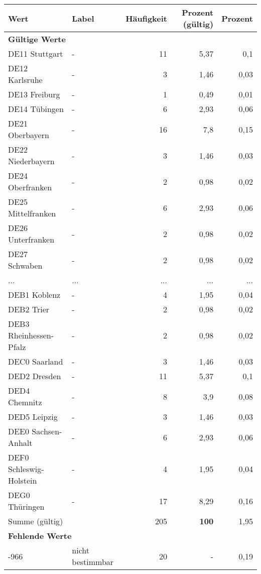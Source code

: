     \begin{longtable}{Xlrrr}
     \toprule
     \textbf{Wert} & \textbf{Label} & \textbf{Häufigkeit} & \textbf{Prozent (gültig)} & \textbf{Prozent} \\
     \endhead
     \midrule
     \multicolumn{5}{l}{\textbf{Gültige Werte}}\\
        \multicolumn{1}{X}{DE11 Stuttgart} & - & 11 & 5,37 & 0,1 \\
        \multicolumn{1}{X}{DE12 Karlsruhe} & - & 3 & 1,46 & 0,03 \\
        \multicolumn{1}{X}{DE13 Freiburg} & - & 1 & 0,49 & 0,01 \\
        \multicolumn{1}{X}{DE14 Tübingen} & - & 6 & 2,93 & 0,06 \\
        \multicolumn{1}{X}{DE21 Oberbayern} & - & 16 & 7,8 & 0,15 \\
        \multicolumn{1}{X}{DE22 Niederbayern} & - & 3 & 1,46 & 0,03 \\
        \multicolumn{1}{X}{DE24 Oberfranken} & - & 2 & 0,98 & 0,02 \\
        \multicolumn{1}{X}{DE25 Mittelfranken} & - & 6 & 2,93 & 0,06 \\
        \multicolumn{1}{X}{DE26 Unterfranken} & - & 2 & 0,98 & 0,02 \\
        \multicolumn{1}{X}{DE27 Schwaben} & - & 2 & 0,98 & 0,02 \\
       ... & ... & ... & ... & ... \\
        \multicolumn{1}{X}{DEB1 Koblenz} & - & 4 & 1,95 & 0,04 \\
        \multicolumn{1}{X}{DEB2 Trier} & - & 2 & 0,98 & 0,02 \\
        \multicolumn{1}{X}{DEB3 Rheinhessen-Pfalz} & - & 2 & 0,98 & 0,02 \\
        \multicolumn{1}{X}{DEC0 Saarland} & - & 3 & 1,46 & 0,03 \\
        \multicolumn{1}{X}{DED2 Dresden} & - & 11 & 5,37 & 0,1 \\
        \multicolumn{1}{X}{DED4 Chemnitz} & - & 8 & 3,9 & 0,08 \\
        \multicolumn{1}{X}{DED5 Leipzig} & - & 3 & 1,46 & 0,03 \\
        \multicolumn{1}{X}{DEE0 Sachsen-Anhalt} & - & 6 & 2,93 & 0,06 \\
        \multicolumn{1}{X}{DEF0 Schleswig-Holstein} & - & 4 & 1,95 & 0,04 \\
        \multicolumn{1}{X}{DEG0 Thüringen} & - & 17 & 8,29 & 0,16 \\
     \midrule
      \multicolumn{2}{l}{Summe (gültig)} & 205 &
      \textbf{100} &
         1,95 \\
     \multicolumn{5}{l}{\textbf{Fehlende Werte}}\\
       -966 & nicht bestimmbar & 20 & - & 0,19 \\


\end{longtable}

